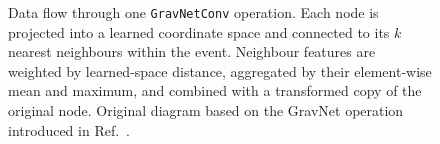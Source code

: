 \begin{figure}[htbp]
{%
    }
    \caption{Data flow through one \texttt{GravNetConv} operation. Each node
    is projected into a learned coordinate space and connected to its
    \(k\) nearest neighbours within the event. Neighbour features are weighted
    by learned-space distance, aggregated by their element-wise mean and
    maximum, and combined with a transformed copy of the original node.
    Original diagram based on the GravNet operation introduced in
    Ref.~\cite{qasim2019-gravnet}.}
    \label{fig:gravnet_convolution}
\end{figure}
